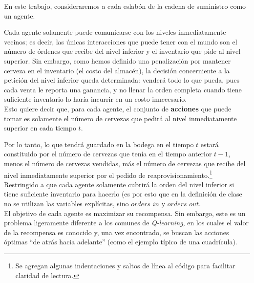 

En este trabajo, consideraremos a cada eslab\'on de la cadena de suministro como un agente. 

Cada agente solamente puede comunicarse con los niveles inmediatamente vecinos; es decir, las \'unicas interacciones que puede tener con el mundo son el n\'umero de \'ordenes que recibe del nivel inferior y el inventario que pide al nivel superior. Sin embargo, como hemos definido una penalizaci\'on por mantener cerveza en el inventario (el costo del almac\'en), la decisi\'on concerniente a la petici\'on del nivel inferior queda determinada: vender\'a todo lo que pueda, pues cada venta le reporta una ganancia, y no llenar la orden completa cuando tiene suficiente inventario lo har\'ia incurrir en un costo innecesario.\\

Esto quiere decir que, para cada agente, el conjunto de \textbf{acciones} que puede tomar es solamente el n\'umero de cervezas que pedir\'a al nivel inmediatamente superior en cada tiempo $t$. 

Por lo tanto, lo que tendr\'a guardado en la bodega en el tiempo $t$ estar\'a constituido por el n\'umero de cervezas que ten\'ia en el tiempo anterior $t-1$, menos el n\'umero de cervezas vendidas, m\'as el n\'umero de cervezas que recibe del nivel inmediatamente superior por el pedido de reaprovisionamiento.\footnote{Se agregan algunas indentaciones y saltos de l\'inea al c\'odigo para facilitar claridad de lectura.}\\

Restringido a que cada agente solamente cubrir\'a la orden del nivel inferior si tiene suficiente inventario para hacerlo (es por esto que en la definici\'on de clase no se utilizan las variables expl\'icitas, sino $orders\_in$ y $orders\_out$.\\

El objetivo de cada agente es maximizar su recompensa. Sin embargo, este es un problema ligeramente diferente a los comunes de \textit{Q-learning}, en los cuales el valor de la recompensa es conocido y, una vez encontrado, se buscan las acciones \'optimas ``de atr\'as hacia adelante'' (como el ejemplo t\'ipico de una cuadr\'icula).\\

